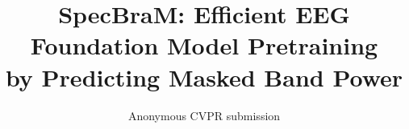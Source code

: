 \documentclass[10pt,twocolumn,letterpaper]{article}
\title{SpecBraM: Efficient EEG Foundation Model Pretraining\\
by Predicting Masked Band Power}
\author{Anonymous CVPR submission}
\begin{document}
\maketitle











{
    \small
    
    
}


\end{document}
